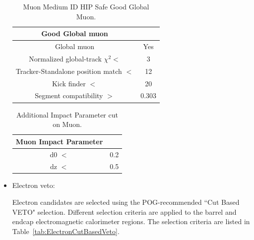 \begin{itemize}
\begin{table}[htbp]
\fontsize{10 pt}{1.2 em}
\selectfont
\begin{centering}
\caption{\label{tab:MuonMediumIDGoodGlobalMuon} Muon Medium ID HIP Safe Good Global Muon.}
\hspace*{-4ex}
\begin{lrbox}{\closureBox}
\begin{tabular}{|c|c|}
\hline
  Good Global muon                      &       \\
\hline
  Global muon                           & Yes   \\
\hline
  Normalized global-track $\chi^{2} <$  & 3     \\
\hline
  Tracker-Standalone position match $<$ & 12    \\
\hline
  Kick finder $<$                       & 20    \\
\hline
  Segment compatibility $>$             & 0.303 \\
\hline
\end{tabular}
\end{lrbox}
\scalebox{0.80}{\usebox{\closureBox}}
\par\end{centering}
\end{table}

\begin{table}[htbp]
\fontsize{10 pt}{1.2 em}
\selectfont
\begin{centering}
\caption{\label{tab:MuonMediumIDImpactParameter} Additional Impact Parameter cut on Muon.}
\hspace*{-4ex}
\begin{lrbox}{\closureBox}
\begin{tabular}{|c|c|}
\hline
  Muon Impact Parameter &     \\
\hline
  d0 $<$                & 0.2 \\
\hline
  dz $<$                & 0.5 \\
\hline
\end{tabular}
\end{lrbox}
\scalebox{0.80}{\usebox{\closureBox}}
\par\end{centering}
\end{table}

\item Electron veto:

Electron candidates are selected using the POG-recommended ``Cut Based VETO" selection. Different selection criteria are applied to the barrel and endcap electromagnetic calorimeter regions. The selection criteria are listed in Table~\ref{tab:ElectronCutBasedVeto}. 


\end{itemize}
